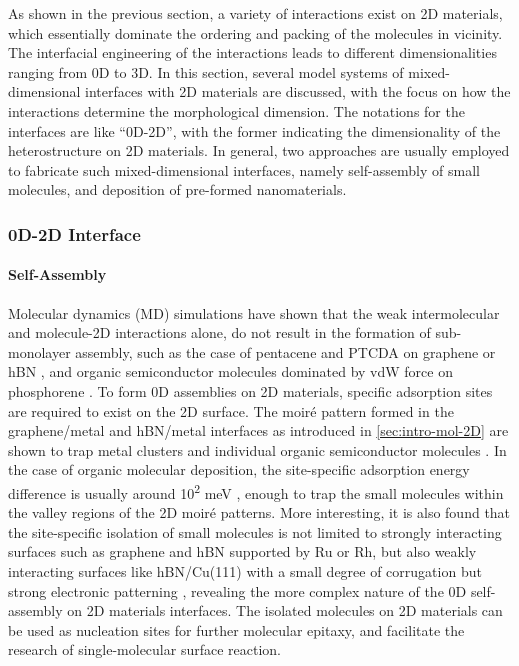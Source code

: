 As shown in the previous section, a variety of interactions exist on 2D
materials, which
essentially dominate the ordering and packing of the molecules in vicinity.
%
The interfacial engineering of the interactions leads to different
dimensionalities ranging from 0D to 3D.
%
In this section, several model systems of mixed-dimensional interfaces
with 2D materials are discussed, with the focus on how the
interactions determine the morphological dimension. The notations for
the interfaces are like ``0D-2D'', with the former indicating the
dimensionality of the heterostructure on 2D materials. In general, two
approaches are usually employed to fabricate such mixed-dimensional
interfaces, namely self-assembly of small molecules, and deposition of
pre-formed nano\-materials. 

\subsubsection{0D-2D Interface}
\label{sec:intro-0D-2D}

\paragraph{Self-Assembly}
\label{sec:org8117691}

Molecular dynamics (MD) simulations have shown that the weak
intermolecular and molecule-2D interactions alone, do not result in
the formation of sub-monolayer assembly, such as the case of pentacene
and PTCDA on graphene or hBN \cite{Zhao_2015_self_assemb_gr_MD}, and
organic semiconductor molecules dominated by vdW force on phosphorene
\cite{Mukhopadhyay_2017_cryst_BP}.
% 
To form 0D assemblies on 2D materials, specific adsorption sites are
required to exist on the 2D surface.
% 
The moiré pattern formed in the graphene/metal and hBN/metal
interfaces as introduced in \autoref{sec:intro-mol-2D} are shown to
trap metal clusters
\cite{Goriachko_2007_assembl_hBN_ru,Pan_2009_Pt_cluster_gr,Wang_2011_gr_hBN_metal_cl,Zhang_2014_metal_gr_Ru}
and individual organic semiconductor molecules
\cite{Joshi_2014_TCNQ_hBN,Dil_2008_hBN_Rh,Lu_2012_c60_gr_moire}.
%
In the case of organic molecular deposition, the site-specific
adsorption energy difference is usually around 10\textsuperscript{2}
meV \cite{Lu_2012_c60_gr_moire}, enough to trap the small molecules
within the valley regions of the 2D moiré patterns. More interesting,
it is also found that the site-specific isolation of small molecules
is not limited to strongly interacting surfaces such as graphene and
hBN supported by Ru or Rh, but also weakly interacting surfaces like
hBN/Cu(111) with a small degree of corrugation but strong electronic
patterning \cite{Joshi_2012_hBN_Cu,Joshi_2014_TCNQ_hBN}, revealing the
more complex nature of the 0D self-assembly on 2D materials interfaces.
%
The isolated molecules on 2D materials can be used as nucleation sites
for further molecular epitaxy, and facilitate the research of
single-molecular surface reaction. 


